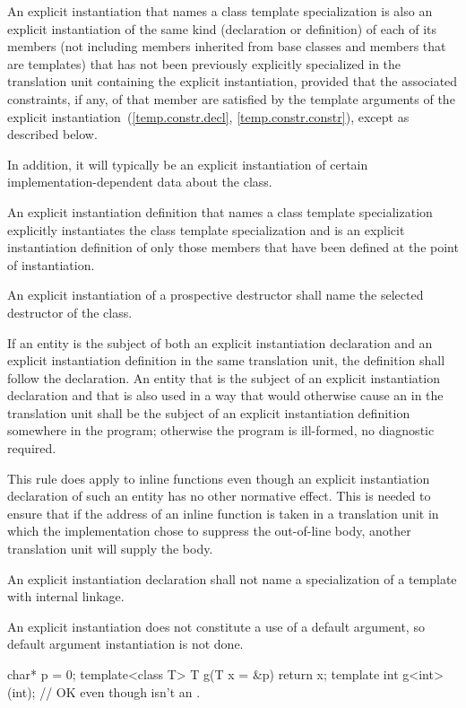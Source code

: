 \pnum
An explicit instantiation that names a class
template specialization is also an explicit
instantiation of the same kind (declaration or definition) of each
of its members (not including members inherited from base classes and members
that are templates) that has not been previously explicitly specialized in
the translation unit containing the explicit instantiation,
provided that the associated constraints, if any,
of that member are satisfied by the template arguments of the explicit
instantiation~(\ref{temp.constr.decl}, \ref{temp.constr.constr}),
except as described below.
\begin{note}
In addition, it will typically be an explicit instantiation of certain
%
implementation-dependent data about the class.
\end{note}

\pnum
An explicit instantiation definition that names a class template
specialization explicitly instantiates the class template specialization
and is an explicit instantiation definition of only those
members that have been defined at the point of instantiation.

\pnum
An explicit instantiation of a prospective destructor
shall name the selected destructor of the class.

\pnum
If an entity is the subject of both an explicit instantiation declaration
and an explicit instantiation definition in the same translation unit, the
definition shall follow the declaration. An entity that is the subject of an
explicit instantiation declaration and that is also used
in a way that would otherwise cause an 
in the translation unit
shall be the subject of an explicit instantiation definition somewhere in the
program; otherwise the program is ill-formed, no diagnostic required.
\begin{note}
This rule does apply to inline functions even though an
explicit instantiation declaration of such an entity has no other normative
effect. This is needed to ensure that if the address of an inline function is
taken in a translation unit in which the implementation chose to suppress the
out-of-line body, another translation unit will supply the body.
\end{note}
An explicit instantiation declaration shall not name a specialization of a
template with internal linkage.

\pnum
An explicit instantiation does not constitute a use of a default argument,
so default argument instantiation is not done.
\begin{example}
\begin{codeblock}
char* p = 0;
template<class T> T g(T x = &p) { return x; }
template int g<int>(int);       // OK even though  isn't an .
\end{codeblock}
\end{example}

